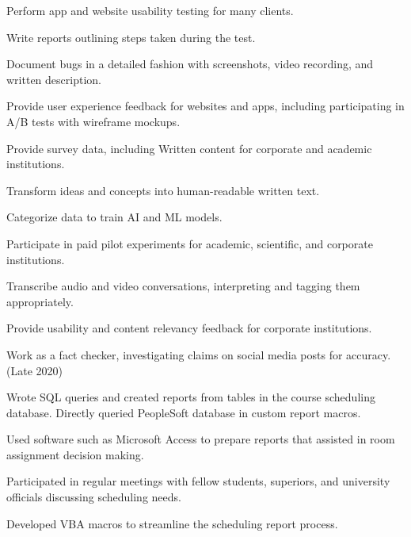 \documentclass[]{deedy-resume-openfont}
\begin{document}
\begin{tightemize}
\item Perform app and website usability testing for many clients.
\item Write reports outlining steps taken during the test.
\item Document bugs in a detailed fashion with screenshots, video recording, and written description.
\end{tightemize}
\sectionsep

\begin{tightemize}
\item Provide user experience feedback for websites and apps, including participating in A/B tests with wireframe mockups.
\item Provide survey data, including Written content for corporate and academic institutions.
\item Transform ideas and concepts into human-readable written text.
\item Categorize data to train AI and ML models.
\item Participate in paid pilot experiments for academic, scientific, and corporate institutions.
\item Transcribe audio and video conversations, interpreting and tagging them appropriately.
\end{tightemize}
\sectionsep

\begin{tightemize}
\item Provide usability and content relevancy feedback for corporate institutions.
\item Work as a fact checker, investigating claims on social media posts for accuracy. (Late 2020)
\end{tightemize}
\sectionsep

\begin{tightemize}
\item Wrote SQL queries and created reports from tables in the course scheduling database. Directly queried PeopleSoft database in custom report macros.
\item Used software such as Microsoft Access to prepare reports that assisted in room assignment decision making.
\item Participated in regular meetings with fellow students, superiors, and university officials discussing scheduling needs.
\item Developed VBA macros to streamline the scheduling report process.
\end{tightemize}
\sectionsep
\end{document}
